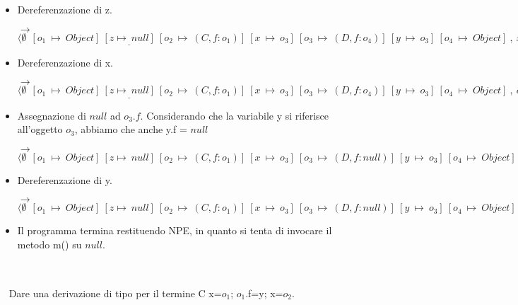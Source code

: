 \begin{itemize}
\vspace{0,5cm}
\item Dereferenzazione di z.

$\rightarrow$ $\langle\emptyset\:\:[o_1\:\mapsto\:Object]\:\underline{[z\mapsto\:null]}\:[o_2\:\mapsto\:(C,f:o_1)]\:[x\:\mapsto\:o_3]\:[o_3\:\mapsto\:(D,f:o_4)]\:[y\:\mapsto\:o_3]\:[o_4\:\mapsto\:Object]\:,\:x.f=null;.....\rangle$

\vspace{0,5cm}
\item Dereferenzazione di x.

$\rightarrow$ $\langle\emptyset\:\:[o_1\:\mapsto\:Object]\:\underline{[z\mapsto\:null]}\:[o_2\:\mapsto\:(C,f:o_1)]\:[x\:\mapsto\:o_3]\:[o_3\:\mapsto\:(D,f:o_4)]\:[y\:\mapsto\:o_3]\:[o_4\:\mapsto\:Object]\:,\:o_3.f=null;.....\rangle$

\vspace{0,5cm}
\item Assegnazione di $null$ ad $o_3.f$. Considerando che la variabile y si riferisce all'oggetto $o_3$, abbiamo che anche y.f = $null$

$\rightarrow$ $\langle\emptyset\:\:[o_1\:\mapsto\:Object]\:[z\mapsto\:null]\:[o_2\:\mapsto\:(C,f:o_1)]\:[x\:\mapsto\:o_3]\:[o_3\:\mapsto\:(D,f:null)]\:[y\:\mapsto\:o_3]\:[o_4\:\mapsto\:Object]\:,\:y.f.m();\rangle$

\vspace{0,5cm}
\item Dereferenzazione di y.

$\rightarrow$ $\langle\emptyset\:\:[o_1\:\mapsto\:Object]\:[z\mapsto\:null]\:[o_2\:\mapsto\:(C,f:o_1)]\:[x\:\mapsto\:o_3]\:[o_3\:\mapsto\:(D,f:null)]\:[y\:\mapsto\:o_3]\:[o_4\:\mapsto\:Object]\:,\:o_3.f.m();\rangle$

\vspace{0,5cm}
\item Il programma termina restituendo NPE, in quanto si tenta di invocare il metodo m() su $null$.

\end{itemize}


\vspace{1,5cm}
\subsection*{}
\
\\
\
\vspace{0,6cm}
Dare una derivazione di tipo per il termine C x=$o_1$; $o_1$.f=y; x=$o_2$.
\vspace{0,6cm}

